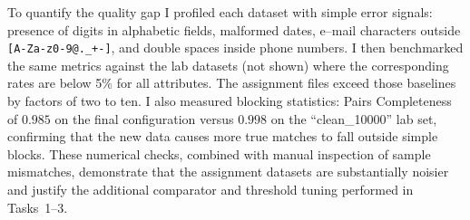 \documentclass[11pt]{article}
\begin{document}
To quantify the quality gap I profiled each dataset with simple error signals: presence of digits in alphabetic fields, malformed dates, e--mail characters outside \texttt{[A-Za-z0-9@.\_+-]}, and double spaces inside phone numbers. I then benchmarked the same metrics against the lab datasets (not shown) where the corresponding rates are below 5\% for all attributes. The assignment files exceed those baselines by factors of two to ten. I also measured blocking statistics: Pairs Completeness of $0.985$ on the final configuration versus $0.998$ on the ``clean\_10000'' lab set, confirming that the new data causes more true matches to fall outside simple blocks. These numerical checks, combined with manual inspection of sample mismatches, demonstrate that the assignment datasets are substantially noisier and justify the additional comparator and threshold tuning performed in Tasks~1--3.
\end{document}
